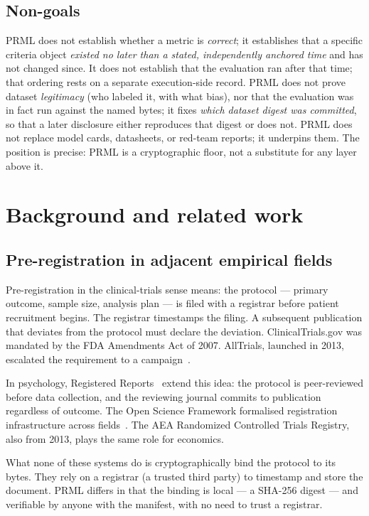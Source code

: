 \documentclass[11pt, a4paper]{article}
\begin{document}
\subsection{Non-goals}

PRML does not establish whether a metric is \emph{correct}; it establishes that a specific criteria object \emph{existed no later than a stated, independently anchored time} and has not changed since. It does not establish that the evaluation ran after that time; that ordering rests on a separate execution-side record. PRML does not prove dataset \emph{legitimacy} (who labeled it, with what bias), nor that the evaluation was in fact run against the named bytes; it fixes \emph{which dataset digest was committed}, so that a later disclosure either reproduces that digest or does not. PRML does not replace model cards, datasheets, or red-team reports; it underpins them. The position is precise: PRML is a cryptographic floor, not a substitute for any layer above it.

\section{Background and related work}
\label{sec:related}

\subsection{Pre-registration in adjacent empirical fields}

Pre-registration in the clinical-trials sense means: the protocol --- primary outcome, sample size, analysis plan --- is filed with a registrar before patient recruitment begins. The registrar timestamps the filing. A subsequent publication that deviates from the protocol must declare the deviation. ClinicalTrials.gov was mandated by the FDA Amendments Act of 2007. AllTrials, launched in 2013, escalated the requirement to a campaign~\cite{goldacre2014alltrials}.

In psychology, Registered Reports~\cite{chambers2013registered} extend this idea: the protocol is peer-reviewed before data collection, and the reviewing journal commits to publication regardless of outcome. The Open Science Framework formalised registration infrastructure across fields~\cite{nosek2018preregistration}. The AEA Randomized Controlled Trials Registry, also from 2013, plays the same role for economics.

What none of these systems do is cryptographically bind the protocol to its bytes. They rely on a registrar (a trusted third party) to timestamp and store the document. PRML differs in that the binding is local --- a SHA-256 digest --- and verifiable by anyone with the manifest, with no need to trust a registrar.
\end{document}
